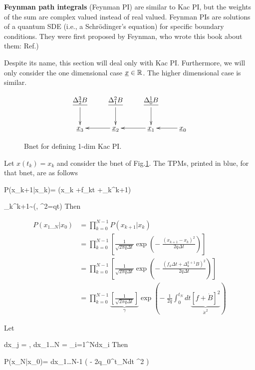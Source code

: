 {\bf Feynman path integrals} (Feynman PI) are similar to Kac PI,
but the weights of the sum are complex valued instead of real valued. Feynman PIs
are solutions of a quantum SDE (i.e., a Schr\"{o}dinger's equation) for specific boundary conditions. They
were first proposed by Feynman,
who  wrote this book
about them: Ref.\cite{feynman-hibbs})

Despite its name,
this section will
deal only with  Kac PI.
Furthermore, we will only
consider the
one dimensional case $\rvx\in\RR$.
The higher dimensional case
is similar.


\begin{figure}[h!]
$$
\xymatrix{
\ul{\Delta_2^3 B} \ar[d]
& \ul{\Delta_1^2 B} \ar[d]
& \ul{\Delta_0^1 B} \ar[d]
& 
\\
\rvx_3
& \rvx _2 \ar[l]
& \rvx_1 \ar[l]
& \rvx_0\ar[l]
}
$$
\caption{Bnet for defining 1-dim Kac PI.}
\label{fig-1dim-kac-pi}
\end{figure}

Let $x(t_k)=x_k$ and consider the bnet
of Fig.\ref{fig-1dim-kac-pi}.
The
TPMs, printed in blue,
for that bnet, are as follows

\beq\color{blue}
P(x_{k+1}|x_{k})= \indi(x_{k}
+f_k\Delta t +\Delta_k^{k+1}\rvB)
\eeq

\beq \color{blue}
\Delta_k^{k+1}\rvB \sim \caln(, \s^2=q\Delta t)
\eeq
Then

\begin{align}
P(x_{1\ldots N}|x_0)&=
\prod_{k=0}^{N-1} P(x_{k+1}|x_{k})
\\
&=
\prod_{k=0}^{N-1}
\left[
\frac{1}{\sqrt{2\pi q\Delta t}}
\exp\left(
-\;
\frac{(x_{k+1}-x_{k})^2}{2q\Delta t}
\right)
\right]
\\
&=
\prod_{k=0}^{N-1}
\left[
\frac{1}{\sqrt{2\pi q \Delta t}}
\exp\left(
-\;
\frac{(f_k\Delta t + \Delta_k^{k+1} B)^2}{2q\Delta t}
\right)
\right]
\\
&=
\prod_{k=0}^{N-1}
\underbrace{\left[
\frac{1}
{\sqrt{2\pi q \Delta t}}
\right]}_{\gamma}
\exp\left(
-\;
\frac{1}
{2q}\int_0^{t_N}dt
\underbrace{[f + \dot{B}]^2}_{\dot{x}^2}
\right)
\label{eq-px-div-pb-source}
\end{align}

Let

\beq
dx_j = \gamma
,\quad
dx_{1\ldots N}
=
\prod_{i=1}^{N}dx_i
\eeq
Then

\beq
P(x_N|x_0)= 
\int dx_{1\ldots N-1}
\exp\left(
-\;
{2q}\int_0^{t_N}dt\;
^2
\right)
\eeq





